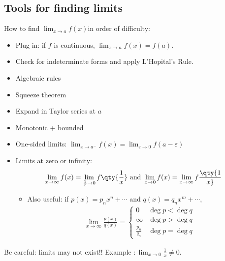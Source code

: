 \hypertarget{tools-for-finding-limits}{%
\subsection{Tools for finding limits}\label{tools-for-finding-limits}}


How to find \(\lim_{x\to a} f(x)\)in order of difficulty:

\begin{itemize}
\item
  Plug in: if \(f\) is continuous, \(\lim_{x\to a} f(x) = f(a)\).
\item
  Check for indeterminate forms and apply L'Hopital's Rule.
\item
  Algebraic rules
\item
  Squeeze theorem
\item
  Expand in Taylor series at \(a\)
\item
  Monotonic + bounded
\item
  One-sided limits:
  \(\lim_{x\to a^-} f(x) = \lim_{\varepsilon \to 0} f(a-\varepsilon)\)
\item
  Limits at zero or infinity:
  \begin{align*}
  \lim_{x\to\infty} f(x) = \lim_{\frac{1}{x}\to 0} f\qty{\frac{1}{x}} \text{ and } 
  \lim_{x\to 0} f(x) = \lim_{x\to\infty} f\qty{1 \over x}
  \end{align*}

  \begin{itemize}
  \tightlist
  \item
    Also useful: if \(p(x) = p_nx^n + \cdots\) and
    \(q(x) = q_nx^m + \cdots\),
    \begin{align*}
    \lim_{x\to\infty} \frac{p(x)}{q(x)} = 
    \begin{cases}
    0 & \deg p < \deg q \\
    \infty & \deg p > \deg q \\
    \frac{p_n}{q_n} & \deg p = \deg q
    \end{cases}
    \end{align*}
  \end{itemize}
\end{itemize}

\begin{warning}

Be careful: limits may not exist!! Example
\(:\lim_{x\to 0} \frac{1}{x} \neq 0\).

\end{warning}

